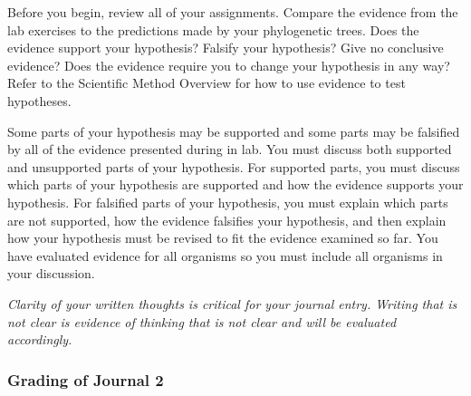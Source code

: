 \documentclass[12pt]{exam}
\begin{document}
Before you begin, review all of your assignments. Compare the evidence from
the lab exercises to the predictions made by your phylogenetic trees. Does the 
evidence support your hypothesis? Falsify your hypothesis? Give no conclusive 
evidence? Does the evidence require you to change your hypothesis in any way? Refer to the Scientific Method
Overview for how to use evidence to test hypotheses.

Some parts of your hypothesis may be supported and
some parts may be falsified by all of the evidence presented during in lab.
You must discuss both supported and unsupported parts of your
hypothesis. For supported parts, you must discuss which parts of your
hypothesis are supported and how the evidence supports your hypothesis.
For falsified parts of your hypothesis, you must explain which parts are
not supported, how the evidence falsifies your hypothesis, and then
explain how your hypothesis must be revised to fit the evidence examined
so far. You have evaluated evidence for all organisms so you must include all organisms in your discussion.

\emph{Clarity of your written thoughts is critical for your journal entry. Writing that is not clear is evidence of
 thinking that is not clear and will be evaluated accordingly.}

\subsubsection*{Grading of Journal 2}
\end{document}
